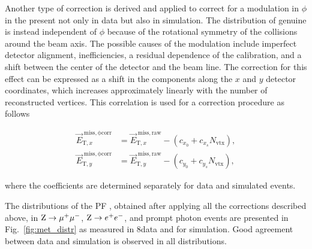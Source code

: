 %
%
Another type of correction is derived and applied to correct for a modulation in $\phi$ in the \ptvecmiss present not only in data but also in simulation. The distribution of genuine \ptvecmiss is instead independent of $\phi$ because of the rotational symmetry of the collisions around the beam axis. The possible causes of the modulation include imperfect detector alignment, inefficiencies, a residual \pt dependence of the calibration, and a shift between the center of the detector and the beam line. The correction for this effect can be expressed as a shift in the \ptvecmiss components along the $x$ and $y$ detector coordinates, which increases approximately linearly with the number of reconstructed vertices. This correlation is used for a correction procedure as follows

\begin{equation}
\begin{split}
{\vec E}_{\mathrm{T},x}^\mathrm{\; miss,\phi corr} & = {\vec E}_{\mathrm{T},x}^\mathrm{\; miss,raw} - (c_{x_0} + c_{x_s}N_\mathrm{vtx}),\\
{\vec E}_{\mathrm{T},y}^\mathrm{\; miss,\phi corr} & = {\vec E}_{\mathrm{T},y}^\mathrm{\; miss,raw} - (c_{y_0} + c_{y_s}N_\mathrm{vtx}),
\end{split}
\end{equation}

\noindent where the coefficients are determined separately for data and simulated events.

The distributions of the PF \ETmiss, obtained after applying all the corrections described above, in $\mathrm{Z}\to\mu^+\mu^-$, $\mathrm{Z}\to e^+e^-$, and prompt photon events are presented in Fig.~\ref{fig:met_distr} as measured in 8\TeV data and for simulation. Good agreement between data and simulation is observed in all distributions.

